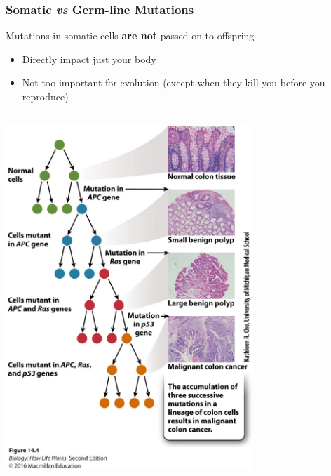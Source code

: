 \documentclass[10pt]{beamer}
\begin{document}
\begin{frame}[t]
\frametitle{Somatic \emph{vs} Germ-line Mutations}
\vspace{0.25cm}

	Mutations in \textcolor{myblue}{somatic cells} \textbf{are not} passed on to offspring \\
		\smallskip
		\begin{itemize}
			\item Directly impact just your body
			\smallskip
			\item Not too important for evolution (except when they kill you before you reproduce)
		\end{itemize}
	
	\vspace{0.25cm}
	
	\begin{columns}
		\begin{column}{0.5\textwidth}
			\centerline{\includegraphics[width=0.7\textwidth]{figures/figure_14_04.jpg}}
		\end{column}
		

\end{columns}
\end{frame}
\end{document}
